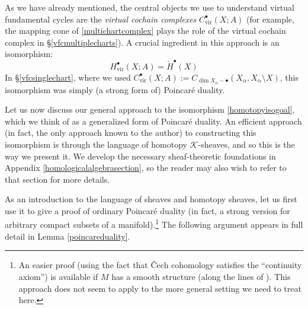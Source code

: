 \documentclass[12pt]{article}
\theoremstyle{definition}
\theoremstyle{remark}
\numberwithin{equation}{subsection}
\newcommand{\K}{\mathcal K}
\newcommand{\cH}{\check H}
\newcommand{\vir}{\mathrm{vir}}
\begin{document}
As we have already mentioned, the central objects we use to understand virtual fundamental cycles are the \emph{virtual cochain complexes} $C^\bullet_\vir(X;A)$ (for example, the mapping cone of \eqref{multichartcomplex} plays the role of the virtual cochain complex in \S\ref{vfcmultiplecharts}).  A crucial ingredient in this approach is an isomorphism:
\begin{equation}\label{homotopyisogoal}
H^\bullet_\vir(X;A)=\cH^\bullet(X)
\end{equation}
In \S\ref{vfcsinglechart}, where we used $C^\bullet_\vir(X;A):=C_{\dim X_\alpha-\bullet}(X_\alpha,X_\alpha\setminus X)$, this isomorphism was simply (a strong form of) Poincar\'e duality.

Let us now discuss our general approach to the isomorphism \eqref{homotopyisogoal}, which we think of as a generalized form of Poincar\'e duality.  An efficient approach (in fact, the only approach known to the author) to constructing this isomorphism is through the language of homotopy $\K$-sheaves, and so this is the way we present it.  We develop the necessary sheaf-theoretic foundations in Appendix \ref{homologicalalgebrasection}, so the reader may also wish to refer to that section for more details.

As an introduction to the language of sheaves and homotopy sheaves, let us first use it to give a proof of ordinary Poincar\'e duality (in fact, a strong version for arbitrary compact subsets of a manifold).\footnote{An easier proof (using the fact that \v Cech cohomology satisfies the ``continuity axiom'') is available if $M$ has a smooth structure (along the lines of \cite[pp887--888 Lemmas 3.1 and 3.3]{pardonHS}).  This approach does not seem to apply to the more general setting we need to treat here.}  The following argument appears in full detail in Lemma \ref{poincareduality}.
\end{document}
